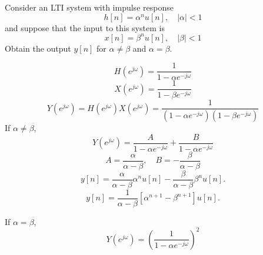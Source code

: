 \begin{frame}
    \begin{example}
        Consider an LTI system with impulse response
        \begin{equation*}
          h[n] = \alpha^n u[n], \quad |\alpha| <1
        \end{equation*}
        and suppose that the input to this system is
        \begin{equation*}
          x[n] = \beta^n u[n], \quad |\beta| <1
        \end{equation*}
        Obtain the output $y[n]$ for $\alpha \neq \beta$ and $\alpha = \beta$.
    \end{example}
\end{frame}


\begin{frame}[allowframebreaks]
	\begin{equation*}
		H(e^{j \omega}) = \frac{1}{1- \alpha e^{-j \omega}}
	\end{equation*}
	\begin{equation*}
		X(e^{j \omega}) = \frac{1}{1- \beta e^{-j \omega}}		
	\end{equation*}
	\pause
	\mode<beamer>
	{
		\begin{equation*}
			Y(e^{j \omega}) = H(e^{j \omega})X(e^{j \omega}) = \frac{1}{(1- \alpha e^{-j \omega})(1- \beta e^{-j \omega})}
		\end{equation*}
		\pause
		If $\alpha \neq \beta$,
		\begin{equation*}
			Y(e^{j \omega}) = \frac{A}{1- \alpha e^{-j \omega}} + \frac{B}{1- \alpha e^{-j \omega}}
		\end{equation*}
		\begin{equation*}
			A = \frac{\alpha}{\alpha- \beta}, \quad B = - \frac{\beta}{\alpha- \beta}
		\end{equation*}	
		\pause
		\begin{equation*}
			y[n] = \frac{\alpha}{\alpha- \beta}\alpha^nu[n] - \frac{\beta}{\alpha- \beta}\beta^nu[n].
		\end{equation*}
		\begin{equation*}
			y[n] = \frac{1}{\alpha- \beta}[\alpha^{n+1} - \beta^{n+1}]u[n].
		\end{equation*}	
	}
\end{frame}

\begin{frame}
	If $\alpha = \beta$,
	\mode<beamer>
	{
		\begin{equation*}
			Y(e^{j \omega}) = \left(\frac{1}{1- \alpha e^{-j \omega}}\right)^2
		\end{equation*}	
	}
\end{frame}

